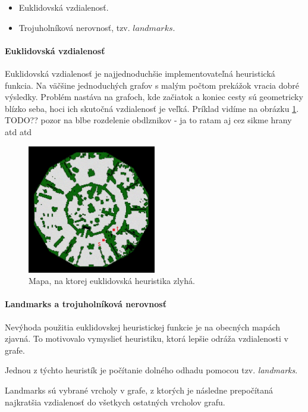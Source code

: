 \begin{itemize}
\item Euklidovská vzdialenosť.
\item Trojuholníková nerovnosť, tzv. $ landmarks $.
\end{itemize}


\paragraph{Euklidovská vzdialenosť}

Euklidovská vzdialenosť je najjednoduchšie implementovateľná heuristická funkcia. Na väčšine jednoduchých grafov s malým počtom prekážok vracia dobré výsledky. Problém nastáva na grafoch, kde začiatok a koniec cesty sú geometricky blízko seba, hoci ich skutočná vzdialenosť je veľká.
Príklad vidíme na obrázku \ref{fig:antieuclid}.
TODO?? pozor na blbe rozdelenie obdlznikov - ja to ratam 
aj cez sikme hrany atd atd


\begin{figure}[H]
\centering
\includegraphics[width=0.5\textwidth]{./img/antieuclid505d.jpg}
\caption{Mapa, na ktorej euklidovská heuristika zlyhá.}
\label{fig:antieuclid}
\end{figure}


\paragraph{Landmarks a trojuholníková nerovnosť}
Nevýhoda použitia euklidovskej heuristickej funkcie je na obecných mapách zjavná. To motivovalo vymyslieť heuristiku, ktorá lepšie odráža vzdialenosti v grafe.

Jednou z týchto heuristík je počítanie dolného odhadu pomocou tzv. {\sl landmarks}. 

Landmarks sú vybrané vrcholy v grafe, z ktorých je následne prepočítaná najkratšia vzdialenosť do všetkych ostatných
vrcholov grafu. 



